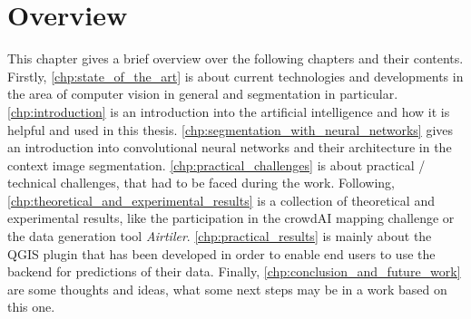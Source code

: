 
\chapter{Overview}\label{chp:overview}
This chapter gives a brief overview over the following chapters and their contents. Firstly, \autoref{chp:state_of_the_art} is about current technologies and developments in the area of computer vision in general and segmentation in particular. \autoref{chp:introduction} is an introduction into the artificial intelligence and how it is helpful and used in this thesis. \autoref{chp:segmentation_with_neural_networks} gives an introduction into convolutional neural networks and their architecture in the context image segmentation. \autoref{chp:practical_challenges} is about practical / technical challenges, that had to be faced during the work. Following, \autoref{chp:theoretical_and_experimental_results} is a collection of theoretical and experimental results, like the participation in the crowdAI mapping challenge or the data generation tool \textit{Airtiler}. \autoref{chp:practical_results} is mainly about the QGIS plugin that has been developed in order to enable end users to use the backend for predictions of their data. Finally, \autoref{chp:conclusion_and_future_work} are some thoughts and ideas, what some next steps may be in a work based on this one.
